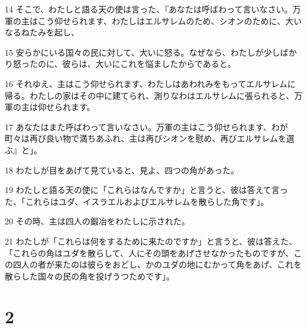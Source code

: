\par 14 そこで、わたしと語る天の使は言った、『あなたは呼ばわって言いなさい。万軍の主はこう仰せられます、わたしはエルサレムのため、シオンのために、大いなるねたみを起し、
\par 15 安らかにいる国々の民に対して、大いに怒る。なぜなら、わたしが少しばかり怒ったのに、彼らは、大いにこれを悩ましたからであると。
\par 16 それゆえ、主はこう仰せられます、わたしはあわれみをもってエルサレムに帰る。わたしの家はその中に建てられ、測りなわはエルサレムに張られると、万軍の主は仰せられます。
\par 17 あなたはまた呼ばわって言いなさい。万軍の主はこう仰せられます、わが町々は再び良い物で満ちあふれ、主は再びシオンを慰め、再びエルサレムを選ぶ』と」。
\par 18 わたしが目をあげて見ていると、見よ、四つの角があった。
\par 19 わたしと語る天の使に「これらはなんですか」と言うと、彼は答えて言った、「これらはユダ、イスラエルおよびエルサレムを散らした角です」。
\par 20 その時、主は四人の鍛冶をわたしに示された。
\par 21 わたしが「これらは何をするために来たのですか」と言うと、彼は答えた、「これらの角はユダを散らして、人にその頭をあげさせなかったものですが、この四人の者が来たのは彼らをおどし、かのユダの地にむかって角をあげ、これを散らした国々の民の角を投げうつためです」。

\chapter{2}


